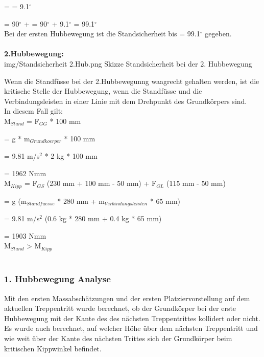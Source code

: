 {\beta} = \arcsin{(18.2 mm / 115 mm)} = 9.1$^\circ$

{\phi} = 90$^\circ$ + {\beta} = 90$^\circ$ + 9.1$^\circ$ = 99.1$^\circ$\\

Bei der ersten Hubbewegung ist die Standsicherheit bis {\phi} = 99.1$^\circ$ gegeben.\\
\\

\textbf{2.Hubbewegung:}\\

\image
 {img/Standsicherheit 2.Hub.png}
 {Skizze Standsicherheit bei der 2. Hubbewegung}

Wenn die Standfüsse bei der 2.Hubbewegunng waagrecht gehalten werden, ist die kritische Stelle der Hubbewegung, wenn die Standfüsse und die Verbindungsleisten in einer Linie mit dem Drehpunkt des Grundkörpers sind.\\

In diesem Fall gilt:\\

M$_{Stand}$ = F$_{GG}$ * 100 mm 

            = g * m$_{Grundkoerper}$ * 100 mm
            
            = 9.81 m/s$^{2}$ * 2 kg * 100 mm
            
            = 1962 Nmm\\

M$_{Kipp}$  = F$_{GS}$ (230 mm + 100 mm - 50 mm) + F$_{GL}$ (115 mm - 50             mm)

            = g (m$_{Standfuesse}$ * 280 mm + m$_{Verbindungsleisten}$ * 65 mm)
            
            = 9.81 m/s$^{2}$ (0.6 kg * 280 mm + 0.4 kg * 65 mm)
            
            = 1903 Nmm\\
            
M$_{Stand}$ > M$_{Kipp}$\\
\\

\subsubsection{1. Hubbewegung Analyse}

Mit den ersten Massabschätzungen und der ersten Platziervorstellung auf dem aktuellen Treppentritt wurde berechnet, ob der Grundkörper bei der erste Hubbewegung mit der Kante des des nächsten Treppentrittes kollidert oder nicht. Es wurde auch berechnet, auf welcher Höhe über dem nächsten Treppentritt und wie weit über der Kante des nächsten Trittes sich der Grundkörper beim kritischen Kippwinkel befindet.

